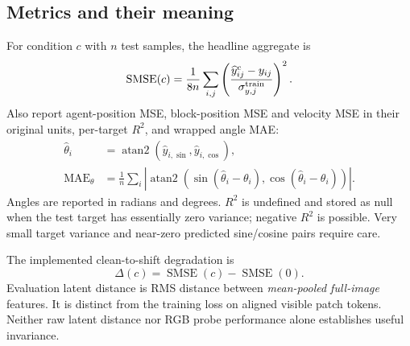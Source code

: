 \documentclass[11pt,a4paper]{article}
\begin{document}
\subsection{Metrics and their meaning}
For condition $c$ with $n$ test samples, the headline aggregate is
\begin{equation}
\operatorname{SMSE}(c)=\frac{1}{8n}\sum_{i,j}
\left(\frac{\widehat y_{ij}^{c}-y_{ij}}{\sigma^{\rm train}_{y,j}}\right)^2.
\end{equation}
Also report agent-position MSE, block-position MSE and velocity MSE in their original
units, per-target $R^2$, and wrapped angle MAE:
\begin{align}
\widehat\theta_i&=\operatorname{atan2}(\widehat y_{i,\sin},\widehat y_{i,\cos}),\\
\operatorname{MAE}_\theta&=\frac1n\sum_i\left|\operatorname{atan2}
(\sin(\widehat\theta_i-\theta_i),\cos(\widehat\theta_i-\theta_i))\right|.
\end{align}
Angles are reported in radians and degrees. $R^2$ is undefined and stored as null
when the test target has essentially zero variance; negative $R^2$ is possible.
Very small target variance and near-zero predicted sine/cosine pairs require care.

The implemented clean-to-shift degradation is
\begin{equation}
\Delta(c)=\operatorname{SMSE}(c)-\operatorname{SMSE}(0).
\end{equation}
Evaluation latent distance is RMS distance between \emph{mean-pooled full-image}
features. It is distinct from the training loss on aligned visible patch tokens.
Neither raw latent distance nor RGB probe performance alone establishes useful invariance.
\end{document}
